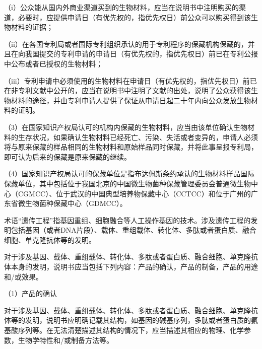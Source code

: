 {\setlength{\parindent}{17.1bp}（i）公众能从国内外商业渠道买到的生物材料，应当在说明书中注明购买的渠道，必要时，应提供申请日（有优先权的，指优先权日）前公众可以购买得到该生物材料的证据；\par}

{\setlength{\parindent}{17.1bp}（ii）在各国专利局或者国际专利组织承认的用于专利程序的保藏机构保藏的，并且在向我国提交的专利申请的申请日（有优先权的，指优先权日）前已在专利公报中公布或者已授权的生物材料；\par}

{\setlength{\parindent}{17.1bp}（iii）专利申请中必须使用的生物材料在申请日（有优先权的，指优先权日）前已在非专利文献中公开的，应当在说明书中注明了文献的出处，说明了公众获得该生物材料的途径，并由专利申请人提供了保证从申请日起二十年内向公众发放生物材料的证明。\par}

{\setlength{\parindent}{17.1bp}（3）在国家知识产权局认可的机构内保藏的生物材料，应当由该单位确认生物材料的生存状况，如果确认生物材料已经死亡、污染、失活或者变异的，申请人必须将与原来保藏的样品相同的生物材料和原始样品同时保藏，并将此事呈报专利局，即可认为后来的保藏是原来保藏的继续。\par}

{\setlength{\parindent}{17.1bp}（4）国家知识产权局认可的保藏单位是指布达佩斯条约承认的生物材料样品国际保藏单位，其中包括位于我国北京的中国微生物菌种保藏管理委员会普通微生物中心（CGMCC）、位于武汉的中国典型培养物保藏中心（CCTCC）和位于广州的广东省微生物菌种保藏中心（GDMCC）。\par}

术语“遗传工程”指基因重组、细胞融合等人工操作基因的技术。涉及遗传工程的发明包括基因（或者DNA片段）、载体、重组载体、转化体、多肽或者蛋白质、融合细胞、单克隆抗体等的发明。

对于涉及基因、载体、重组载体、转化体、多肽或者蛋白质、融合细胞、单克隆抗体本身的发明，说明书应当包括下列内容：产品的确认，产品的制备，产品的用途和/或效果。

{\setlength{\parindent}{17.1bp}（1）产品的确认\par}

对于涉及基因、载体、重组载体、转化体、多肽或者蛋白质、融合细胞、单克隆抗体等的发明，说明书应明确记载其结构，如基因的碱基序列，多肽或者蛋白质的氨基酸序列等。在无法清楚描述其结构的情况下，应当描述其相应的物理、化学参数，生物学特性和/或制备方法等。

